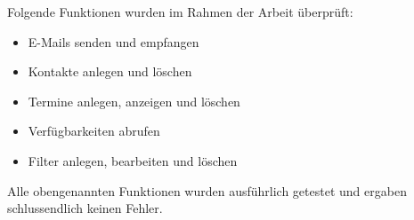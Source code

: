 Folgende Funktionen wurden  im Rahmen der Arbeit überprüft:\\

\begin{itemize}
	\item E-Mails senden und empfangen
	\item Kontakte anlegen und löschen
	\item Termine anlegen, anzeigen und löschen
	\item Verfügbarkeiten abrufen
	\item Filter anlegen, bearbeiten und löschen \\
\end{itemize}

Alle obengenannten Funktionen wurden ausführlich getestet und ergaben schlussendlich keinen Fehler.
